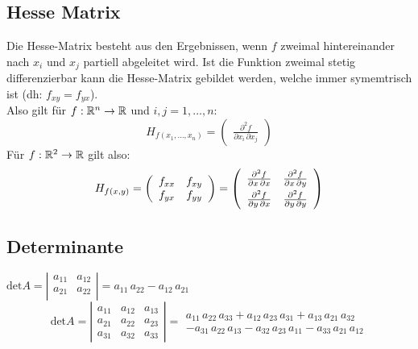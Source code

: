\subsection{Hesse Matrix}
Die Hesse-Matrix besteht aus den Ergebnissen, wenn $f$ zweimal hintereinander nach $x_i$ und $x_j$ partiell abgeleitet wird. Ist die Funktion zweimal stetig differenzierbar kann die Hesse-Matrix gebildet werden, welche immer symemtrisch ist (dh: $f_{xy} = f_{yx}$). \\
Also gilt für $f: \mathbb{R}^n \to \mathbb{R}$ und $i,j = 1, \ldots, n$:
\[
	H_{f(x_1, \ldots, x_n)} = 
	\left(
		\begin{array}{c}
			\frac{\partial^2 f}{\partial x_i \, \partial x_j}
		\end{array}
	\right)
\]
Für $f: \mathbb{R}^2 \to \mathbb{R}$ gilt also:
\[
	H_{f(x, y)} = 
	\left(
		\begin{array}{cc}
			f_{xx} & f_{xy}\\
			f_{yx} & f_{yy}
		\end{array}
	\right)	=
	\left(
		\begin{array}{cc}
			\vspace{0.1cm} \frac{\partial^2 f}{\partial x \, \partial x} & \frac{\partial^2 f}{\partial x \, \partial y} \\
			\frac{\partial^2 f}{\partial y \, \partial x} & \frac{\partial^2 f}{\partial y \, \partial y}
		\end{array}
	\right)
\]

\subsection{Determinante}
{\small
$
	\text{det} A = 
	\left|
		\begin{array}{cc}
			a_{11} & a_{12}\\
			a_{21} & a_{22}\\
		\end{array}
	\right| = a_{11} \, a_{22} - a_{12} \, a_{21}
$
\[
	\text{det} A = 
	\left|
		\begin{array}{ccc}
			a_{11} & a_{12} & a_{13}\\
			a_{21} & a_{22} & a_{23}\\
			a_{31} & a_{32} & a_{33}
		\end{array}
	\right| = 
	\begin{array}{c}
			a_{11} \, a_{22} \, a_{33} + a_{12} \, a_{23} \, a_{31} + a_{13} \, a_{21} \, a_{32}\\
			- a_{31} \, a_{22} \, a_{13} - a_{32} \, a_{23} \, a_{11} - a_{33} \, a_{21} \, a_{12}
	\end{array}
\]}

